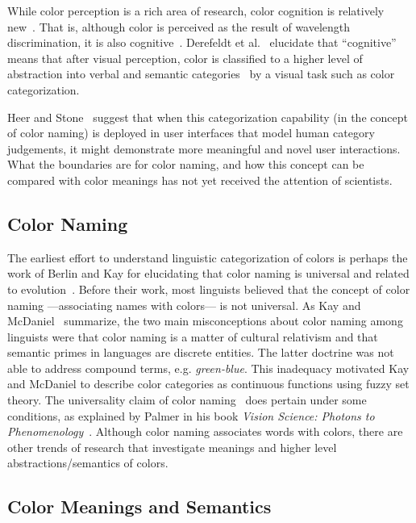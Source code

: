 \documentclass[prodmode,acmtochi]{acmsmall}
\begin{document}
While color perception is a rich area of research, color cognition is relatively new~\cite{pylyshyn1999vision}.
That is, although color is perceived as the result of wavelength discrimination, it is also cognitive~\cite{skorupski2011colour}.
Derefeldt et al.~\cite{derefeldt2004cognitive} elucidate that ``cognitive'' means that after visual perception, color is classified to a higher level of abstraction into verbal and semantic categories~\cite{humphreys1989visual,barsalou1999perceptual} by a visual task such as color categorization.


Heer and Stone~\cite{heer2012color} suggest that when this categorization capability (in the concept of color naming) is deployed in user interfaces that model human category judgements, it might demonstrate more meaningful and novel user interactions. What the boundaries are for color naming, and how this concept can be compared with color meanings has not yet received the attention of scientists.

\subsection{Color Naming}

The earliest effort to understand linguistic categorization of colors is perhaps the work of Berlin and Kay for elucidating that color naming is universal and related to evolution~\cite{berlin1991basic}. Before their work, most linguists believed that the concept of color naming ---associating names with colors--- is not universal. As Kay and McDaniel~\cite{kay1978linguistic} summarize, the two main misconceptions about color naming among linguists were that color naming is a matter of cultural relativism and that semantic primes in languages are discrete entities. The latter doctrine was not able to address compound terms, e.g. \emph{green-blue}. This inadequacy motivated Kay and McDaniel to describe color categories as continuous functions using fuzzy set theory.
The universality claim of color naming~\cite{berlin1991basic} does pertain under some conditions, as explained by Palmer in his book \emph{Vision Science: Photons to Phenomenology}~\cite{palmer1999vision}. Although color naming associates words with colors, there are other trends of research that investigate meanings and higher level abstractions/semantics of colors.


\subsection{Color Meanings and Semantics}
\end{document}
